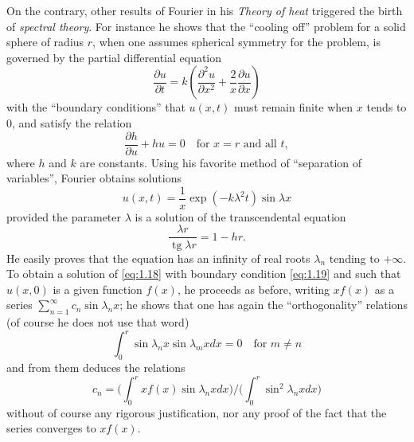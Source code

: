 \documentclass[12pt,a4paper,leqno,twoside]{extbook}
\newcommand{\pder}[2]{\frac{\partial #1}{\partial #2}}
\begin{document}
On the contrary, other results of Fourier in his \emph{Theory of heat} triggered the birth of \emph{spectral theory}. For instance \cite[vol.~I, p.~304]{067} he shows that the ``cooling off'' problem for a solid sphere of radius \(r\), when one assumes spherical symmetry for the problem, is governed by the partial differential equation
\begin{equation}
    \label{eq:1.18}
    \pder{u}{t} = k \left(\frac{\partial^2 u}{\partial x^2} + \frac{2}{x} \pder{u}{x}\right)
\end{equation}
with the ``boundary conditions'' that \(u(x,t)\) must remain finite when \(x\) tends to 0, and satisfy the relation
\begin{equation}
    \label{eq:1.19}
    \pder{h}{u} + hu = 0 \quad \text{for \(x=r\) and all \(t\)},
\end{equation}
where \(h\) and \(k\) are constants. Using his favorite method of ``separation of variables'', Fourier obtains solutions
\begin{equation}
    \label{eq:1.20}
    u(x,t) = \frac{1}{x} \exp{\left(-k\lambda^2 t\right)}\sin{\lambda x}
\end{equation}
provided the parameter \(\lambda\) is a solution of the transcendental equation
\begin{equation}
    \label{eq:1.21}
    \frac{\lambda r}{\operatorname{tg}{\lambda r}} = 1 - hr.
\end{equation}
He easily proves that the equation has an infinity of real roots \(\lambda_n\) tending to \(+\infty\). To obtain a solution of \eqref{eq:1.18} with boundary condition \eqref{eq:1.19} and such that \(u(x,0)\) is a given function \(f(x)\), he proceeds as before, writing \(xf(x)\) as a series \(\sum\limits_{n=1}^\infty c_n \sin{\lambda_n x}\); he shows that one has again the ``orthogonality'' relations (of course he does not use that word)
\begin{equation}
    \label{eq:1.22}
    \int_0^r \sin \lambda_n x \sin \lambda_m x dx = 0 \quad \text{for \(m \neq n\)}
\end{equation}
and from them deduces the relations
\begin{equation}
    \label{eq:1.23}
    c_n = \Bigg(\int_0^r xf(x)\sin{\lambda_n x} dx\Bigg) \Bigg/ \Bigg(\int_0^r \sin^2{\lambda_n x} dx\Bigg)
\end{equation}
without of course any rigorous justification, nor any proof of the fact that the series converges to \(xf(x)\).
\end{document}
